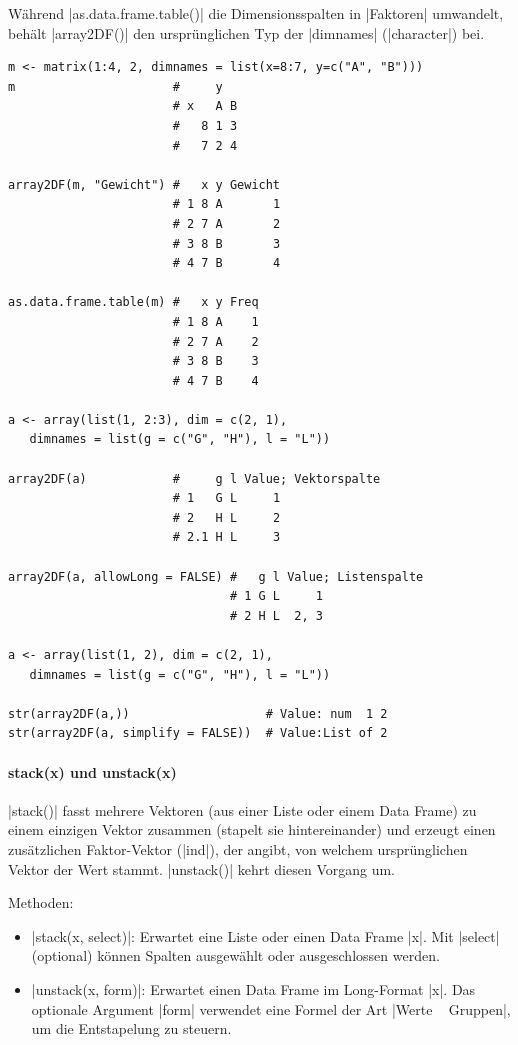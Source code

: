 \documentclass[10pt,twocolumn]{scrartcl}
\renewcommand{\lstinline}{\mycoloredinline}
\begin{document}
Während \lstinline|as.data.frame.table()| die Dimensionsspalten in \lstinline|Faktoren| umwandelt, behält \lstinline|array2DF()| den ursprünglichen Typ der \lstinline|dimnames| (\lstinline|character|) bei.

\begin{lstlisting}
m <- matrix(1:4, 2, dimnames = list(x=8:7, y=c("A", "B")))
m                      #     y
                       # x   A B
                       #   8 1 3
                       #   7 2 4

array2DF(m, "Gewicht") #   x y Gewicht
                       # 1 8 A       1
                       # 2 7 A       2
                       # 3 8 B       3
                       # 4 7 B       4

as.data.frame.table(m) #   x y Freq
                       # 1 8 A    1
                       # 2 7 A    2
                       # 3 8 B    3
                       # 4 7 B    4

a <- array(list(1, 2:3), dim = c(2, 1),
   dimnames = list(g = c("G", "H"), l = "L"))

array2DF(a)            #     g l Value; Vektorspalte
                       # 1   G L     1
                       # 2   H L     2
                       # 2.1 H L     3

array2DF(a, allowLong = FALSE) #   g l Value; Listenspalte
                               # 1 G L     1
                               # 2 H L  2, 3

a <- array(list(1, 2), dim = c(2, 1),
   dimnames = list(g = c("G", "H"), l = "L"))

str(array2DF(a,))                   # Value: num  1 2
str(array2DF(a, simplify = FALSE))  # Value:List of 2
\end{lstlisting}


\paragraph{stack(x) und unstack(x)}

\lstinline|stack()| fasst mehrere Vektoren (aus einer Liste oder einem Data Frame) zu einem einzigen Vektor zusammen (stapelt sie hintereinander) und erzeugt einen zusätzlichen Faktor-Vektor (\lstinline|ind|), der angibt, von welchem ursprünglichen Vektor der Wert stammt. \lstinline|unstack()| kehrt diesen Vorgang um.

Methoden:
\begin{itemize}
\item \lstinline|stack(x, select)|: Erwartet eine Liste oder einen Data Frame \lstinline|x|. Mit \lstinline|select| (optional) können Spalten ausgewählt oder ausgeschlossen werden.
\item \lstinline|unstack(x, form)|: Erwartet einen Data Frame im Long-Format \lstinline|x|. Das optionale Argument \lstinline|form| verwendet eine Formel der Art \lstinline|Werte ~ Gruppen|, um die Entstapelung zu steuern.
\end{itemize}
\end{document}
